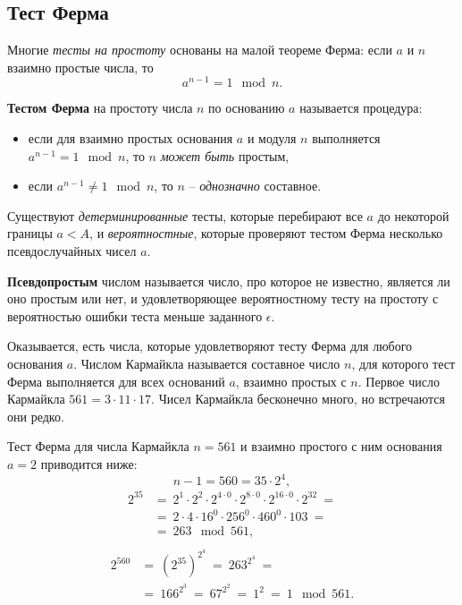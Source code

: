 \subsection{Тест Ферма}

Многие \emph{тесты на простоту} основаны на малой теореме Ферма: если $a$ и $n$ взаимно простые числа, то
    \[ a^{n-1} = 1 \mod n. \]

\textbf{Тестом Ферма} на простоту числа $n$ по основанию $a$ называется процедура:
\begin{itemize}
    \item если для взаимно простых основания $a$ и модуля $n$ выполняется $a^{n-1} = 1 \mod n$, то $n$ \emph{может быть} простым,
    \item если $a^{n-1} \ne 1 \mod n$, то $n$ -- \emph{однозначно} составное.
\end{itemize}

Существуют \emph{детерминированные} тесты, которые перебирают все $a$ до некоторой границы $a < A$, и \emph{вероятностные}, которые проверяют тестом Ферма несколько псевдослучайных чисел $a$.

\textbf{Псевдопростым} числом называется число, про которое не известно, является ли оно простым или нет, и удовлетворяющее вероятностному тесту на простоту с вероятностью ошибки теста меньше заданного $\epsilon$.

Оказывается, есть числа, которые удовлетворяют тесту Ферма для любого основания $a$. Числом Кармайкла называется составное число $n$, для которого тест Ферма выполняется для всех оснований $a$, взаимно простых с $n$. Первое число Кармайкла $561 = 3 \cdot 11 \cdot 17$. Чисел Кармайкла бесконечно много, но встречаются они редко.

\example
Тест Ферма для числа Кармайкла $n = 561$ и взаимно простого с ним основания $a = 2$ приводится ниже:
\[
    n - 1 = 560 = 35 \cdot 2^4,
\] \[ \begin{array}{ll}
    2^{35} & =~ 2^1 \cdot 2^2 \cdot 2^{4 \cdot 0} \cdot 2^{8 \cdot 0} \cdot 2^{16 \cdot 0} \cdot 2^{32} ~= \\
        & =~ 2 \cdot 4 \cdot 16^0 \cdot 256^0 \cdot 460^0 \cdot 103 ~= \\
        & =~ 263 \mod 561, \\
\end{array} \] \[ \begin{array}{ll}
    2^{560} & =~ \left( 2^{35} \right)^{2^4} ~=~ 263^{2^4} ~= \\
        & =~ 166^{2^3} ~=~ 67^{2^2} ~=~ 1^{2} ~=~ 1 \mod 561.
\end{array} \]
\exampleend
